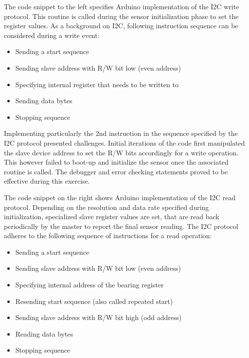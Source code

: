\documentclass{article}
\begin{document}
\newpage
\begin{flushleft}
The code snippet to the left specifies Arduino implementation of the I2C write protocol. This routine is called during the sensor initialization phase to set the register values. As a background on I2C, following instruction sequence can be considered during a write event:
\end{flushleft}

\begin{itemize}
\item Sending a start sequence
\item Sending slave address with R/W bit low (even address)
\item Specifying internal register that needs to be written to
\item Sending data bytes
\item Stopping sequence
\end{itemize}

\begin{flushleft}
Implementing particularly the 2nd instruction in the sequence specified by the I2C protocol presented challenges. Initial iterations of the code first manipulated the slave device address to set the R/W bits accordingly for a write operation. This however failed to boot-up and initialize the sensor once the associated routine is called. The debugger and error checking statements proved to be effective during this exercise. 
\end{flushleft}

\begin{flushleft}
The code snippet on the right shows Arduino implementation of the I2C read protocol. Depending on the resolution and data rate specified during initialization, specialized slave register values are set, that are read back periodically by the master to report the final sensor reading. The I2C protocol adheres to the following sequence of instructions for a read operation:
\end{flushleft}

\begin{itemize}
\item Sending a start sequence
\item Sending slave address with R/W bit low (even address)
\item Specifying internal address of the bearing register
\item Resending start sequence (also called repeated start)
\item Sending slave address with R/W bit high (odd address)
\item Reading data bytes
\item Stopping sequence
\end{itemize}
\end{document}
